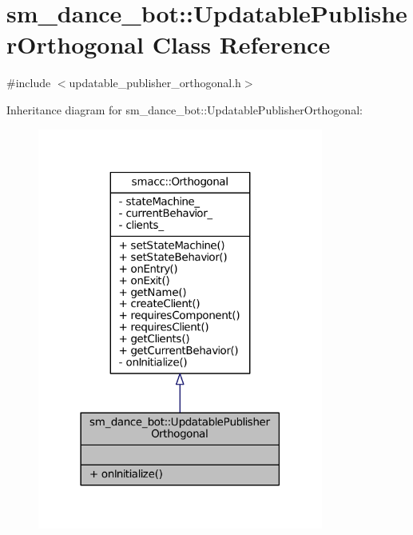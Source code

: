 \hypertarget{classsm__dance__bot_1_1UpdatablePublisherOrthogonal}{}\section{sm\+\_\+dance\+\_\+bot\+:\+:Updatable\+Publisher\+Orthogonal Class Reference}
\label{classsm__dance__bot_1_1UpdatablePublisherOrthogonal}


{\ttfamily \#include $<$updatable\+\_\+publisher\+\_\+orthogonal.\+h$>$}



Inheritance diagram for sm\+\_\+dance\+\_\+bot\+:\+:Updatable\+Publisher\+Orthogonal\+:
\nopagebreak
\begin{figure}[H]
\begin{center}
\leavevmode
\includegraphics[width=266pt]{classsm__dance__bot_1_1UpdatablePublisherOrthogonal__inherit__graph}
\end{center}
\end{figure}


